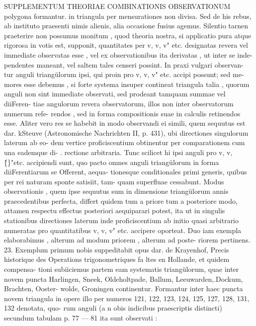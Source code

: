 \documentclass[12pt,a4paper]{article}
\begin{document}
 SUPPLEMENTUM THEORIAE COMBINATIONIS OBSERVATIONUM
polygona formantur. in triangula per mensurationes non divisa. Sed de his rebus,
ab instituto praesenti nimis alienis, alia occasione fusius agemus. Silentio tarnen
praeterire non possumus monitum , quod theoria nostra, si applicatio pura atque
rigorosa in votis est, supponit, quantitates per v, v, v" etc. designatas revera vel
immediate observatas esse , vel ex observationibus ita derivatas , ut inter se inde-
pendentes maneant, vel saltem tales censeri possint. In praxi vulgari observan-
tur anguli triangülorum ipsi, qui proin pro v, v, v" etc. accipi possunt; sed me-
mores esse debemus , si forte systema insuper contineat triangula talia , quorum
anguli non sint immediate observati, sed prodeant tamquam summae vel diiFeren-
tiae angulorum revera observatorum, illos non inter observatorum numerum refe-
rendos , sed in forma compositionis suae in calculis retinendos esse. Aliter vero
res se habebit in modo observandi ei simili, quem sequutus est dar. kSteuve
(Astronomische Nachrichten II, p. 431), ubi directiones singulorum laterum ab eo-
dem vertice proficiscentium obtinentur per comparationem cum una eademque di- .
rectione arbitraria. Tunc scilicet hi ipsi anguli pro v, v, \^\{\}"etc. accipiendi sunt,
quo pacto omnes anguli triangülorum in forma diiFerentiarum se Offerent, aequa-
tionesque conditionales primi generis, quibus per rei naturam sponte satisiit, tam-
quam superfluae cessabunt. Modus observationis , quem ipse sequutus sum in
dimensione triangülorum annis praecedentibus perfecta, differt quidem tum a
priore tum a posteriore modo, attamen respectu effectus posteriori aequiparari
potest, ita ut in singulis stationibus directiones laterum inde proficiscentium ab
initio quasi arbitrario numeratas pro quantitatibus v, v, v" etc. accipere oporteat.
Duo iam exempla elaborabimus , alterum ad modum priorem , alterum ad poste-
riorem pertinens.
23.
Exemplum primum nobis suppeditabit opus dar. de Krayenhof, Precis
historique des Operations trigonometriques fa ltes en Hollande, et quidem compensa-
tioni subiiciemus partem eam systematis triangülorum, quae inter novem puncta
Harlingen, Sneek, Oldeholtpade, Ballum, Leeuwarden,.Dockum, Brachten, Ooster-
wolde, Groningen continentur. Formantur inter haec puncta novem triangula in
opere illo per numeros 121, 122, 123, 124, 125, 127, 128, 131, 132 denotata, quo-
rum anguli (a n obis indicibus praescriptis distincti) secundum tabulam p. 77 --- 81
ita sunt observati :
\end{document}
